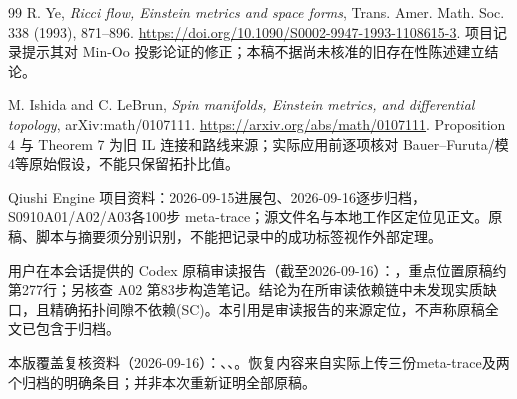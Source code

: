 \documentclass[UTF8,a4paper,11pt,fontset=fandol]{ctexart}
\numberwithin{equation}{section}
\theoremstyle{definition}
\begin{document}
\begin{thebibliography}{99}
 R. Ye, \emph{Ricci flow, Einstein metrics and space forms}, Trans. Amer. Math. Soc. 338 (1993), 871--896. \url{https://doi.org/10.1090/S0002-9947-1993-1108615-3}. 项目记录提示其对 Min-Oo 投影论证的修正；本稿不据尚未核准的旧存在性陈述建立结论。

 M. Ishida and C. LeBrun, \emph{Spin manifolds, Einstein metrics, and differential topology}, arXiv:math/0107111. \url{https://arxiv.org/abs/math/0107111}. Proposition 4 与 Theorem 7 为旧 IL 连接和路线来源；实际应用前逐项核对 Bauer--Furuta/模4等原始假设，不能只保留拓扑比值。

 Qiushi Engine 项目资料：2026-09-15进展包、2026-09-16逐步归档，S0910A01/A02/A03各100步 meta-trace；源文件名与本地工作区定位见正文。原稿、脚本与摘要须分别识别，不能把记录中的成功标签视作外部定理。

 用户在本会话提供的 Codex 原稿审读报告（截至2026-09-16）：，重点位置原稿约第277行；另核查 A02 第83步构造笔记。结论为在所审读依赖链中未发现实质缺口，且精确拓扑间隙不依赖(SC)。本引用是审读报告的来源定位，不声称原稿全文已包含于归档。

 本版覆盖复核资料（2026-09-16）：、、。恢复内容来自实际上传三份meta-trace及两个归档的明确条目；并非本次重新证明全部原稿。
\end{thebibliography}
\end{document}
